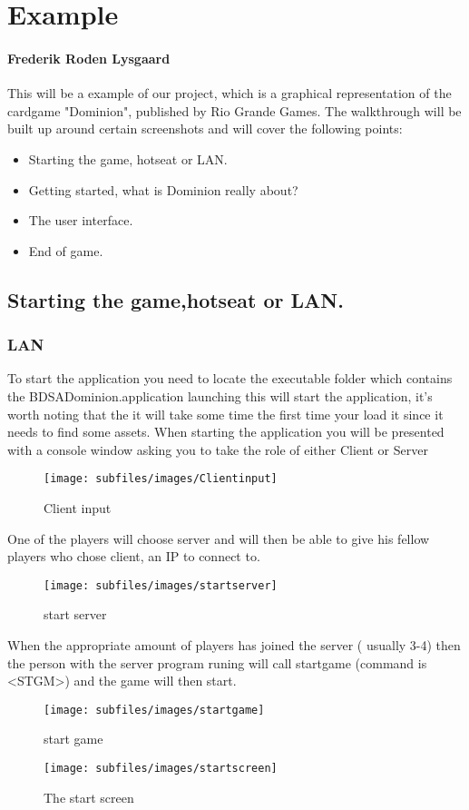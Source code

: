 \section{Example}
\label{sec:Examp}
\paragraph{Frederik Roden Lysgaard}
This will be a example of our project, which is a graphical representation of the cardgame "Dominion", published by Rio Grande Games.
The walkthrough will be built up around certain screenshots and will cover the following points:

\begin{itemize}
\item Starting the game, hotseat or LAN.
\item Getting started, what is Dominion really about?
\item The user interface.
\item End of game.
\end{itemize}

\subsection{Starting the game,hotseat or LAN.}
\subsubsection{LAN}
To start the application you need to locate the executable folder which contains the BDSADominion.application launching this will start the application, it's worth noting that the it will take some time the first time your load it since it needs to find some assets. When starting the application you will be presented with a console window asking you to take the role of either Client or Server

\begin{figure}[h!]
\centering
\texttt{[image: subfiles/images/Clientinput]}
\caption{Client input}
\end{figure}

One of the players will choose server and will then be able to give his fellow players who chose client, an IP to connect to.
\begin{figure}[h!]
\centering
\texttt{[image: subfiles/images/startserver]}
\caption{start server}
\end{figure}
When the appropriate amount of players has joined the server ( usually 3-4) then the person with the server program runing will
call startgame (command is \textless STGM\textgreater ) and the game will then start.
\begin{figure}[h!]
\centering
\texttt{[image: subfiles/images/startgame]}
\caption{start game}
\end{figure}
\begin{figure}[h!]
\centering
\texttt{[image: subfiles/images/startscreen]}
\caption{The start screen}
\end{figure}
